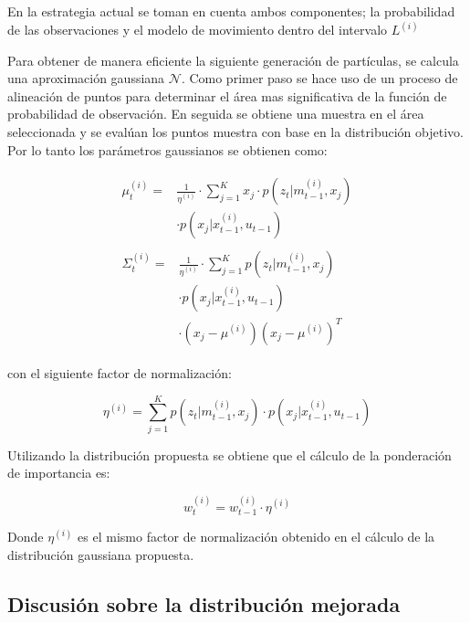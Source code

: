 \documentclass[10pt,a4paper]{article}
\begin{document}
En la estrategia actual se toman en cuenta ambos componentes; la probabilidad de las observaciones y el modelo de movimiento dentro del intervalo $ L^{(i)} $

Para obtener de manera eficiente la siguiente generación de partículas, se calcula una aproximación gaussiana $ \mathcal{N} $. Como primer paso se hace uso de un proceso de alineación de puntos para determinar el área mas significativa de la función de probabilidad de observación. En seguida se obtiene una muestra en el área seleccionada y se evalúan los puntos muestra con base en la distribución objetivo. Por lo tanto los parámetros gaussianos se obtienen como:

	\begin{align}
		\begin{aligned}
			\mu_{t}^{(i)} = 
				& \frac{1}{\eta^{(i)}} \cdot \sum^{K}_{j=1}  x_{j} \cdot p(z_{t}|m_{t-1}^{(i)},x_{j}) \\ 
				& \cdot p(x_{j} | x_{t-1}^{(i)}, u_{t-1})
		\end{aligned} \\
		\begin{aligned}
			\Sigma^{(i)}_{t} =
				& \frac{1}{\eta^{(i)}} \cdot \sum^{K}_{j=1} p(z_{t} | m_{t-1}^{(i)},x_{j}) \\
				& \cdot p(x_{j} | x_{t-1}^{(i)}, u_{t-1}) \\
				& \cdot (x_{j} - \mu^{(i)})(x_{j} - \mu^{(i)})^{T} 
		\end{aligned}
	\end{align}

con el siguiente factor de normalización:

	\begin{equation}
		\eta^{(i)} = \sum^{K}_{j=1} p(z_{t} | m_{t-1}^{(i)},x_{j}) \cdot
			p(x_{j} | x_{t-1}^{(i)}, u_{t-1})
	\end{equation}

Utilizando la distribución propuesta se obtiene que el cálculo de la ponderación de importancia es:

	\begin{equation}
		w_{t}^{(i)} = w_{t-1}^{(i)} \cdot \eta^{(i)}
	\end{equation}

Donde $ \eta^{(i)} $ es el mismo factor de normalización obtenido en el cálculo de la distribución gaussiana propuesta.

\subsection{Discusión sobre la distribución mejorada}
\end{document}
